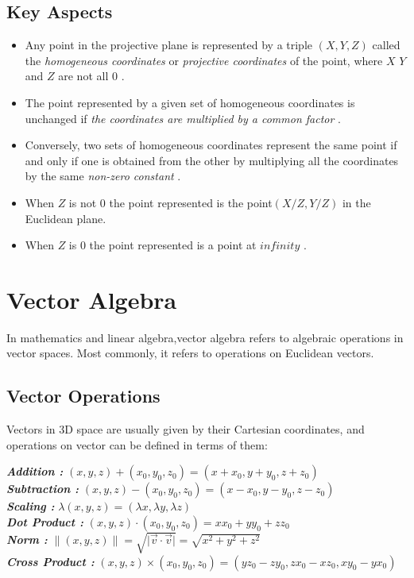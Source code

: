 \documentclass[12pt]{report}
\begin{document}
\subsection{Key Aspects}
\begin{itemize}
  \item 
  Any point in the projective plane is represented by a triple $ (X,Y,Z) $  called the \textit{ homogeneous coordinates } or \textit{ projective coordinates } of the point, where $ X $ $Y $ and $ Z $  are not all $ 0 $ .
  \item 
  The point represented by a given set of homogeneous coordinates is unchanged if \textit{  the coordinates are multiplied by a common factor }.
  \item 
  Conversely, two sets of homogeneous coordinates represent the same point if and only if one is obtained from the other by multiplying all the coordinates by the same  \textit{ non-zero constant }.
  \item 
  When $ Z $ is not $ 0$  the point represented is the point$ (X/Z,Y/Z)$ in the Euclidean plane.
  \item 
  When $ Z $ is $ 0$  the point represented is a point at $ infinity $ .
\end{itemize}

\section{Vector Algebra}


\hspace{1cm} In mathematics and linear algebra,vector algebra refers to algebraic operations in vector spaces. Most commonly, it refers to operations on Euclidean vectors.

\subsection{Vector Operations}

Vectors in 3D space are usually given by their Cartesian coordinates, and operations on vector can be defined in terms of them:

\vspace{0.3cm}

\indent \textbf{\textit{Addition : }} $ (x, y, z) + (x_{0} , y_{0} ,z_{0}) = (x + x_{0}, y + y_{0}, z + z_{0}) $  \\
\indent \textbf{\textit{Subtraction : }} $(x, y, z) - (x_{0} , y_{0} ,z_{0}) = (x - x_{0} ,y - y_{0}, z - z_{0})$ \\
\indent \textbf{\textit{Scaling : }} $ \lambda (x, y, z) = (\lambda x, \lambda y, \lambda z)  $ \\
\indent \textbf{\textit{Dot Product : }}$ (x, y, z) \cdot (x_{0} , y_{0} ,z_{0} ) = x x_{0} + y y_{0} + z z_{0} $ \\
\indent \textbf{\textit{Norm : }} $ \| ( x , y , z ) \| = \sqrt{\vert \overrightarrow{v} \cdot \overrightarrow{v} \vert } = \sqrt{x^2 + y^2 + z^2} $ \\
\indent \textbf{\textit{Cross Product : }} $ ( x , y , z ) \times (x_{0} , y_{0} ,z_{0} ) = (yz_{0} - zy_{0} ,zx_{0} - xz_{0} , xy_{0} - yx_{0} ) $ \\
\end{document}
